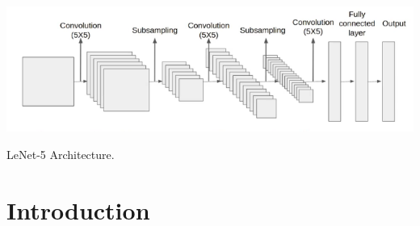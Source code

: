 \documentclass[manuscript,screen,review]{acmart}
\begin{document}

\begin{teaserfigure}
  \includegraphics[width=\textwidth]{../presentation/lenet5.png}
  \caption{LeNet-5 Architecture.}
  \label{fig:teaser}
\end{teaserfigure}


\maketitle

\section{Introduction}
\end{document}
